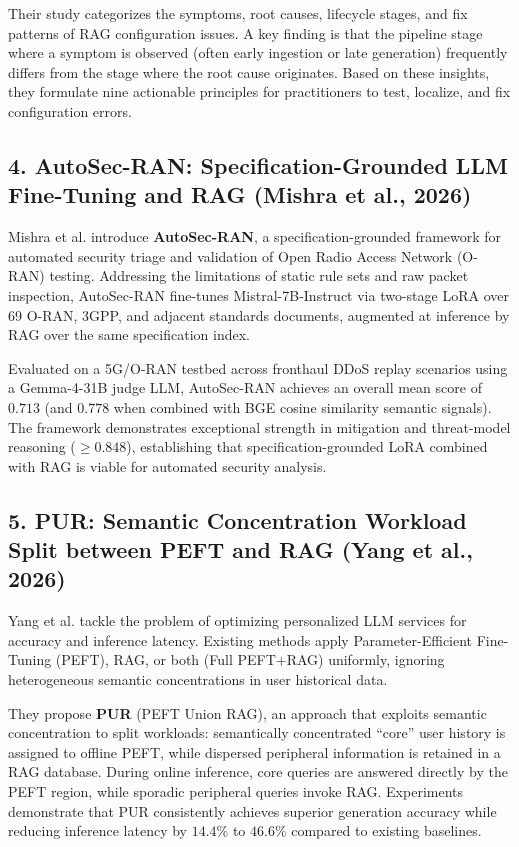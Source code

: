 \documentclass[10pt,journal,compsoc]{IEEEtran}
\begin{document}
Their study categorizes the symptoms, root causes, lifecycle stages, and fix patterns of RAG configuration issues. A key finding is that the pipeline stage where a symptom is observed (often early ingestion or late generation) frequently differs from the stage where the root cause originates. Based on these insights, they formulate nine actionable principles for practitioners to test, localize, and fix configuration errors.

\subsection{4. AutoSec-RAN: Specification-Grounded LLM Fine-Tuning and RAG (Mishra et al., 2026)}
Mishra et al. \cite{mishra2026autosec} introduce \textbf{AutoSec-RAN}, a specification-grounded framework for automated security triage and validation of Open Radio Access Network (O-RAN) testing. Addressing the limitations of static rule sets and raw packet inspection, AutoSec-RAN fine-tunes Mistral-7B-Instruct via two-stage LoRA over 69 O-RAN, 3GPP, and adjacent standards documents, augmented at inference by RAG over the same specification index.

Evaluated on a 5G/O-RAN testbed across fronthaul DDoS replay scenarios using a Gemma-4-31B judge LLM, AutoSec-RAN achieves an overall mean score of $0.713$ (and $0.778$ when combined with BGE cosine similarity semantic signals). The framework demonstrates exceptional strength in mitigation and threat-model reasoning ($\ge 0.848$), establishing that specification-grounded LoRA combined with RAG is viable for automated security analysis.

\subsection{5. PUR: Semantic Concentration Workload Split between PEFT and RAG (Yang et al., 2026)}
Yang et al. \cite{yang2026fast} tackle the problem of optimizing personalized LLM services for accuracy and inference latency. Existing methods apply Parameter-Efficient Fine-Tuning (PEFT), RAG, or both (Full PEFT+RAG) uniformly, ignoring heterogeneous semantic concentrations in user historical data.

They propose \textbf{PUR} (PEFT Union RAG), an approach that exploits semantic concentration to split workloads: semantically concentrated ``core'' user history is assigned to offline PEFT, while dispersed peripheral information is retained in a RAG database. During online inference, core queries are answered directly by the PEFT region, while sporadic peripheral queries invoke RAG. Experiments demonstrate that PUR consistently achieves superior generation accuracy while reducing inference latency by $14.4\%$ to $46.6\%$ compared to existing baselines.
\end{document}
